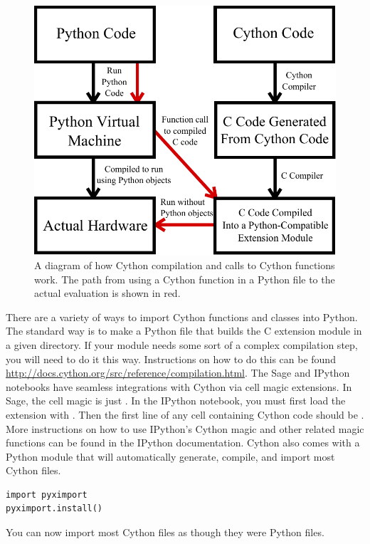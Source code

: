 \begin{figure}
\includegraphics[width=\textwidth]{compilation.pdf}
\caption{A diagram of how Cython compilation and calls to Cython functions work.
The path from using a Cython function in a Python file to the actual evaluation is shown in red.}
\label{cython:compilation}
\end{figure}

There are a variety of ways to import Cython functions and classes into Python.
The standard way is to make a Python file that builds the C extension module in a given directory.
If your module needs some sort of a complex compilation step, you will need to do it this way.
Instructions on how to do this can be found \url{http://docs.cython.org/src/reference/compilation.html}.
The Sage and IPython notebooks have seamless integrations with Cython via cell magic extensions.
In Sage, the cell magic is just .
In the IPython notebook, you must first load the extension with .
Then the first line of any cell containing Cython code should be .
More instructions on how to use IPython's Cython magic and other related magic functions can be found in the IPython documentation.
Cython also comes with a Python module  that will automatically generate, compile, and import most Cython files.
\begin{lstlisting}
import pyximport
pyximport.install()
\end{lstlisting}
You can now import most Cython files as though they were Python files.

